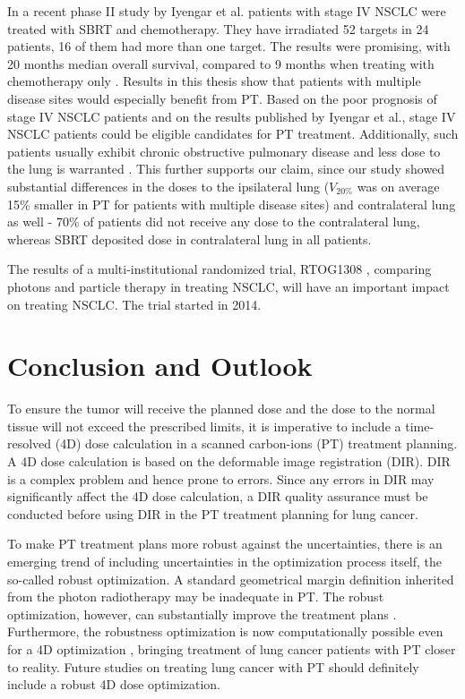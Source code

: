 In a recent phase II study by Iyengar et al. \cite{Iyengar2014} patients with stage IV NSCLC were treated with SBRT and chemotherapy. 
They have irradiated 52 targets in 24 patients, 16 of them had more than one target. The results were promising, with 20 months median overall survival, 
compared to 9 months when treating with chemotherapy only \cite{Tsao2008}. Results in this thesis show that patients with multiple disease sites 
would especially benefit from PT. Based on the poor prognosis of stage IV NSCLC patients and on the results published by Iyengar et al.,
stage IV NSCLC patients could be eligible candidates for PT treatment. Additionally, such patients usually exhibit chronic obstructive pulmonary disease and 
less dose to the lung is warranted \cite{Westover2012}. This further supports our claim, since our study showed substantial differences in 
the doses to the ipsilateral lung ($V_{20\%}$ was on average 15\% smaller in PT for patients with multiple disease sites) and 
contralateral lung as well - 70\% of patients did not receive any dose to the contralateral lung, whereas SBRT deposited dose in contralateral lung in all patients.

The results of a multi-institutional randomized trial, RTOG1308 \cite{RTOG1308}, comparing photons and particle therapy in treating NSCLC,
will have an important impact on treating NSCLC. The trial started in 2014.


\chapter{Conclusion and Outlook}



To ensure the tumor will receive the planned dose and the dose to the normal tissue will not exceed the prescribed limits, it is imperative
to include a time-resolved (4D) dose calculation in a scanned carbon-ions (PT) treatment planning. A 4D dose calculation is based on the deformable image registration (DIR).
DIR is a complex problem and hence prone to errors. Since any errors in DIR may significantly affect the 4D dose calculation, a DIR
quality assurance must be conducted before using DIR in the PT treatment planning for lung cancer.

To make PT treatment plans more robust against the uncertainties, there is an emerging trend of including uncertainties in the optimization process itself, the so-called robust optimization.
A standard geometrical margin definition inherited from the photon radiotherapy may be inadequate in PT. The robust optimization, however, can substantially improve the treatment plans \cite{Chen2012}. Furthermore, the robustness optimization is 
now computationally possible even for a 4D optimization \cite{Liu2016}, bringing treatment of lung cancer patients with PT closer to reality. Future studies on
treating lung cancer with PT should definitely include a robust 4D dose optimization.

